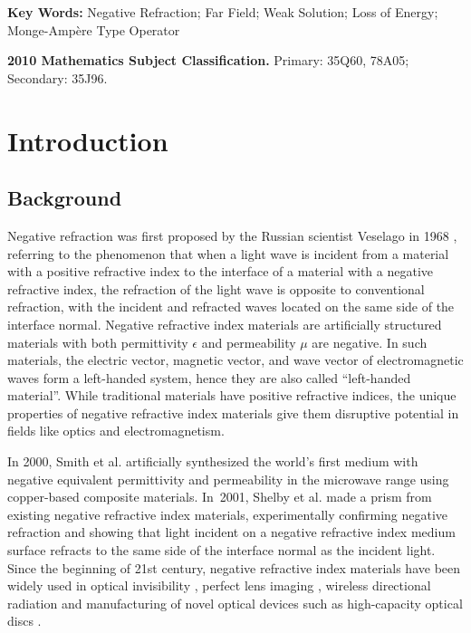 \documentclass[a4paper,12pt,]{article}
\numberwithin{equation}{section}
\numberwithin{equation}{section} \allowdisplaybreaks
\begin{document}
{\bf Key Words:} Negative Refraction; Far Field; Weak Solution; Loss of Energy; Monge-Amp\`ere Type Operator
	
{{\bf 2010 Mathematics Subject Classification.} Primary: 35Q60, 78A05; Secondary: 35J96.}
	

\tableofcontents

\section{Introduction}\label{Section 1}

 

\subsection{Background}

Negative refraction was first proposed by the Russian scientist Veselago in 1968 \cite{Ve68}, referring to the phenomenon that when a light wave is incident from a material with a positive refractive index to the interface of a material with a negative refractive index, the refraction of the light wave is opposite to conventional refraction, with the incident and refracted waves located on the same side of the interface normal. Negative refractive index materials are artificially structured materials with both permittivity $\epsilon$ and permeability $\mu$ are negative. In such materials, the electric vector, magnetic vector, and wave vector of electromagnetic waves form a left-handed system, hence they are also called ``left-handed material''. While traditional materials have positive refractive indices, the unique properties of negative refractive index materials give them disruptive potential in fields like optics and electromagnetism.

In 2000, Smith et al. \cite{SP00} artificially synthesized the world's first medium with negative equivalent permittivity and permeability in the microwave range using copper-based composite materials. In~2001, Shelby et al. \cite{SS01} made a prism from existing negative refractive index materials, experimentally confirming negative refraction and showing that light incident on a negative refractive index medium surface refracts to the same side of the interface normal as the incident light. Since the beginning of 21st century, negative refractive index materials have been widely used in optical invisibility \cite{CT05}, perfect lens imaging \cite{PR02,Pen00}, wireless directional radiation \cite{ET02} and manufacturing of novel optical devices such as high-capacity optical discs \cite{LH04}.
\end{document}
